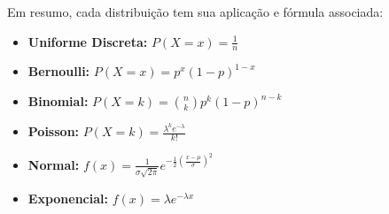 \documentclass[a4paper,12pt]{article}
\begin{document}
Em resumo, cada distribuição tem sua aplicação e fórmula associada:

\begin{itemize}
    \item \textbf{Uniforme Discreta:} \( P(X = x) = \frac{1}{n} \)
    \item \textbf{Bernoulli:} \( P(X = x) = p^x (1-p)^{1-x} \)
    \item \textbf{Binomial:} \( P(X = k) = \binom{n}{k} p^k (1 - p)^{n - k} \)
    \item \textbf{Poisson:} \( P(X = k) = \frac{\lambda^k e^{-\lambda}}{k!} \)
    \item \textbf{Normal:} \( f(x) = \frac{1}{\sigma \sqrt{2\pi}} e^{ -\frac{1}{2} \left( \frac{x - \mu}{\sigma} \right)^2 } \)
    \item \textbf{Exponencial:} \( f(x) = \lambda e^{-\lambda x} \)
\end{itemize}
\end{document}
